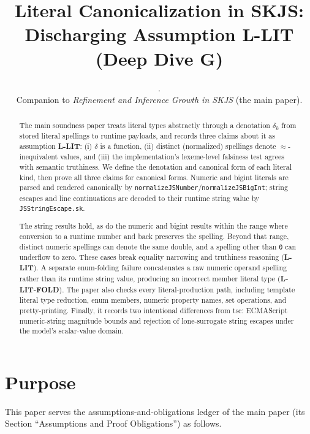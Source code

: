 \documentclass[11pt]{article}
\title{Literal Canonicalization in SKJS:\\
Discharging Assumption \textbf{L-LIT} (Deep Dive G)}
\author{}
\date{\skjspin.\\
Companion to \emph{Refinement and Inference Growth in SKJS} (the main paper).}
\begin{document}
\maketitle

\begin{abstract}
The main soundness paper treats literal types abstractly through a
denotation $\delta_k$ from stored literal spellings to runtime payloads, and
records three claims about it as assumption \textbf{L-LIT}: (i) $\delta$ is
a function, (ii) distinct (normalized) spellings denote
$\approx$-inequivalent values, and (iii) the implementation's lexeme-level
falsiness test agrees with semantic truthiness. We define the denotation and
canonical form of each literal kind, then prove all three claims for canonical
forms. Numeric and bigint literals are parsed and rendered canonically by
\texttt{normalizeJSNumber}/\texttt{normalizeJSBigInt}; string escapes and line
continuations are decoded to their runtime string value by
\texttt{JSStringEscape.sk}.

The string results hold, as do the numeric and bigint results within the range
where conversion to a runtime number and back preserves the spelling. Beyond
that range, distinct numeric spellings can denote the same double, and a
spelling other than \texttt{0} can underflow to zero. These cases break equality
narrowing and truthiness reasoning (\textbf{L-LIT}). A separate enum-folding
failure concatenates a raw numeric operand spelling rather than its runtime
string value, producing an incorrect member literal type
(\textbf{L-LIT-FOLD}). The paper also checks every literal-production path,
including template literal type reduction, enum members, numeric property
names, set operations, and pretty-printing. Finally, it records two intentional
differences from tsc: ECMAScript numeric-string magnitude bounds and rejection
of lone-surrogate string escapes under the model's scalar-value domain.
\end{abstract}

\tableofcontents

\section{Purpose}
\label{sec:purpose}

This paper serves the assumptions-and-obligations ledger of the main paper
(its Section ``Assumptions and Proof Obligations'') as follows.
\end{document}
